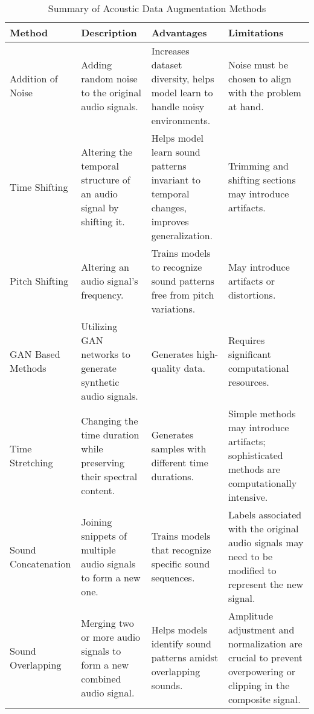 \begin{table}[hp]
\caption{Summary of Acoustic Data Augmentation Methods}
\label{tab:acoustic-data-augmentation}
\begin{tabularx}{\textwidth}{|p{2cm}|X|X|X|}
\hline
\textbf{Method}     & \textbf{Description}                                                                             & \textbf{Advantages}                                                                                  & \textbf{Limitations}                                                                                             \\ \hline
Addition of Noise   & Adding random noise to the original audio signals. & Increases dataset diversity, helps model learn to handle noisy environments.                         & Noise must be chosen to align with the problem at hand.                            \\ \hline
Time Shifting       & Altering the temporal structure of an audio signal by shifting it. & Helps model learn sound patterns invariant to temporal changes, improves generalization. & Trimming and shifting sections may introduce artifacts.                                    \\ \hline
Pitch Shifting      & Altering an audio signal's frequency. & Trains models to recognize sound patterns free from pitch variations.                                & May introduce artifacts or distortions.                                       \\ \hline
\ac{GAN} Based Methods   & Utilizing \ac{GAN} networks to generate synthetic audio signals.            & Generates high-quality data.                      & Requires significant computational resources.                     \\ \hline
Time Stretching     & Changing the time duration while preserving their spectral content.             & Generates samples with different time durations.                     & Simple methods may introduce artifacts; sophisticated methods are computationally intensive.     \\ \hline
Sound Concatenation & Joining snippets of multiple audio signals to form a new one.               & Trains models that recognize specific sound sequences.                         & Labels associated with the original audio signals may need to be modified to represent the new signal. \\ \hline
Sound Overlapping   & Merging two or more audio signals to form a new combined audio signal.                           & Helps models identify sound patterns amidst overlapping sounds.              & Amplitude adjustment and normalization are crucial to prevent overpowering or clipping in the composite signal.  \\ \hline
\end{tabularx}
\end{table}

